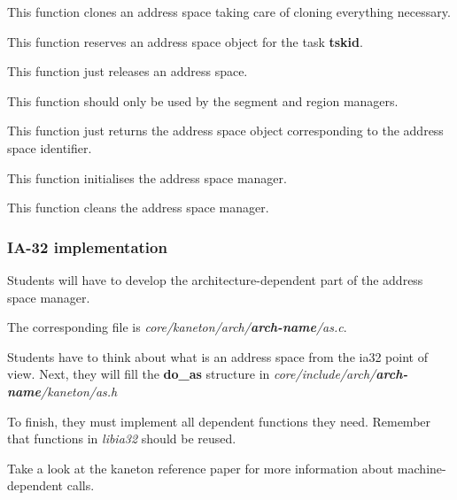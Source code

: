 
This function clones an address space taking care of cloning everything
necessary.


This function reserves an address space object for the task \textbf{tskid}.


This function just releases an address space.


This function should only be used by the segment and region managers.

This function just returns the address space object corresponding to
the address space identifier.


This function initialises the address space manager.


This function cleans the address space manager.

%
%

\subsubsection{IA-32 implementation}

Students will  have to develop the architecture-dependent  part of the
address space manager.

The corresponding file is \textit{core/kaneton/arch/\textbf{arch-name}/as.c}.

Students have  to think about what  is an address space  from the ia32
point of view.  Next, they will fill the \textbf{do\_as} structure in
\textit{core/include/arch/\textbf{arch-name}/kaneton/as.h}

To  finish,   they  must   implement  all  dependent   functions  they
need. Remember that functions in \textit{libia32} should be reused.

Take a look at the  kaneton reference paper for more information about
machine-dependent calls.

